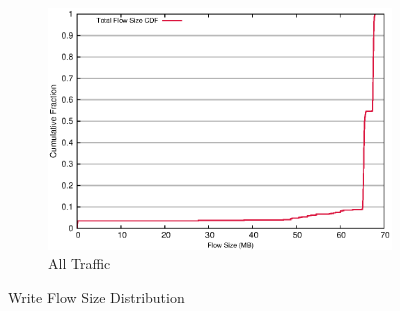 \begin{figure}[!ht]
\begin{subfigure}[b]{.75\linewidth}
	\includegraphics[width=.99\textwidth]{figures/6writes/flow_size.eps}
	\caption{All Traffic}\label{fig:write_size:all}
   \end{subfigure}%
\caption{Write Flow Size Distribution}
\end{figure}

